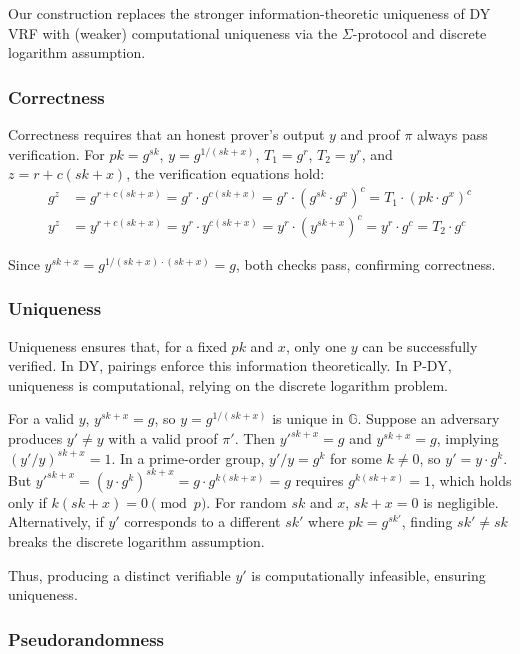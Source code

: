 Our construction replaces the stronger information-theoretic uniqueness of DY VRF with (weaker) computational uniqueness via the $\Sigma$-protocol and discrete logarithm assumption.


\subsubsection{Correctness}

Correctness requires that an honest prover’s output $y$ and proof $\pi$ always pass verification. For $pk = g^{sk}$, $y = g^{1/(sk + x)}$, $T_1 = g^r$, $T_2 = y^r$, and $z = r + c(sk + x)$, the verification equations hold:
\begin{align*}
g^z &= g^{r + c(sk + x)} = g^r \cdot g^{c(sk + x)} = g^r \cdot (g^{sk} \cdot g^x)^c = T_1 \cdot (pk \cdot g^x)^c \\
y^z &= y^{r + c(sk + x)} = y^r \cdot y^{c(sk + x)} = y^r \cdot (y^{sk + x})^c = y^r \cdot g^c = T_2 \cdot g^c
\end{align*}

Since $y^{sk + x} = g^{1/(sk + x) \cdot (sk + x)} = g$, both checks pass, confirming correctness.

\subsubsection{Uniqueness}

Uniqueness ensures that, for a fixed $pk$ and $x$, only one $y$ can be successfully verified. In DY, pairings enforce this information theoretically. In P-DY, uniqueness is computational, relying on the discrete logarithm problem.

For a valid $y$, $y^{sk + x} = g$, so $y = g^{1/(sk + x)}$ is unique in $\mathbb{G}$. Suppose an adversary produces $y' \neq y$ with a valid proof $\pi'$. Then $y'^{sk + x} = g$ and $y^{sk + x} = g$, implying $(y'/y)^{sk + x} = 1$. In a prime-order group, $y'/y = g^k$ for some $k \neq 0$, so $y' = y \cdot g^k$. But $y'^{sk + x} = (y \cdot g^k)^{sk + x} = g \cdot g^{k(sk + x)} = g$ requires $g^{k(sk + x)} = 1$, which holds only if $k(sk + x) = 0 \pmod{p}$. For random $sk$ and $x$, $sk + x = 0$ is negligible. Alternatively, if $y'$ corresponds to a different $sk'$ where $pk = g^{sk'}$, finding $sk' \neq sk$ breaks the discrete logarithm assumption.

Thus, producing a distinct verifiable $y'$ is computationally infeasible, ensuring uniqueness.

\subsubsection{Pseudorandomness}

